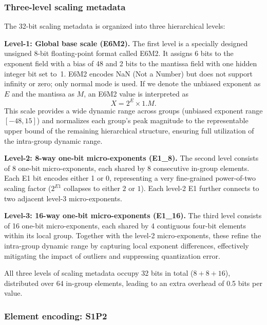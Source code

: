 \documentclass{article}
\begin{document}
\subsubsection{Three-level scaling metadata}

The 32-bit scaling metadata is organized into three hierarchical levels:

\textbf{Level-1: Global base scale (E6M2).}
The first level is a specially designed unsigned 8-bit floating-point format
called E6M2. It assigns 6 bits to the exponent field with a bias of 48 and 2
bits to the mantissa field with one hidden integer bit set to~1. E6M2 encodes
NaN (Not a Number) but does not support infinity or zero; only normal mode is
used. If we denote the unbiased exponent as $E$ and the mantissa as $M$, an
E6M2 value is interpreted as
\begin{equation}
  X = 2^{E} \times 1.M .
  \label{eq:e6m2}
\end{equation}
This scale provides a wide dynamic range across groups (unbiased exponent range
$[-48, 15]$) and normalizes each group's peak magnitude to the representable
upper bound of the remaining hierarchical structure, ensuring full utilization
of the intra-group dynamic range.

\textbf{Level-2: 8-way one-bit micro-exponents (E1\_8).}
The second level consists of 8 one-bit micro-exponents, each shared by 8
consecutive in-group elements. Each E1 bit encodes either 1 or 0, representing
a very fine-grained power-of-two scaling factor ($2^{E1}$ collapses to either
$2$ or $1$). Each level-2 E1 further connects to two adjacent level-3
micro-exponents.

\textbf{Level-3: 16-way one-bit micro-exponents (E1\_16).}
The third level consists of 16 one-bit micro-exponents, each shared by 4
contiguous four-bit elements within its local group. Together with the level-2
micro-exponents, these refine the intra-group dynamic range by capturing local
exponent differences, effectively mitigating the impact of outliers and
suppressing quantization error.

All three levels of scaling metadata occupy 32 bits in total ($8 + 8 + 16$),
distributed over 64 in-group elements, leading to an extra overhead of 0.5 bits
per value.


\subsubsection{Element encoding: S1P2}
\end{document}
